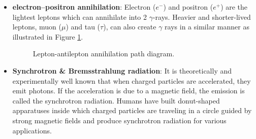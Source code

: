 \begin{itemize}
    \item \textbf{electron–positron annihilation}:
    Electron ($e^-$) and positron ($e^+$) are the lightest
    leptons which can annihilate into 2 $\gamma$-rays.
    Heavier and shorter-lived leptons, muon ($\mu$) and
    tau ($\tau$), can also create $\gamma$ rays in a similar
    manner as illustrated in Figure \ref{fig:lepton_annihilation}.

    \begin{figure}[h!]
        \centering
            \hfill
            \hfill
            \caption{Lepton-antilepton annihilation path diagram.}
           \label{fig:lepton_annihilation}
    \end{figure}

    \item \textbf{Synchrotron \& Bremsstrahlung radiation}:
    It is theoretically and experimentally well known that when
    charged particles are accelerated, they emit photons.
    If the acceleration is due to a magnetic field, the emission
    is called the synchrotron radiation. Humans have built
    donut-shaped apparatuses inside which charged particles
    are traveling in a circle guided by strong magnetic fields
    and produce synchrotron radiation for various applications.


\end{itemize}
